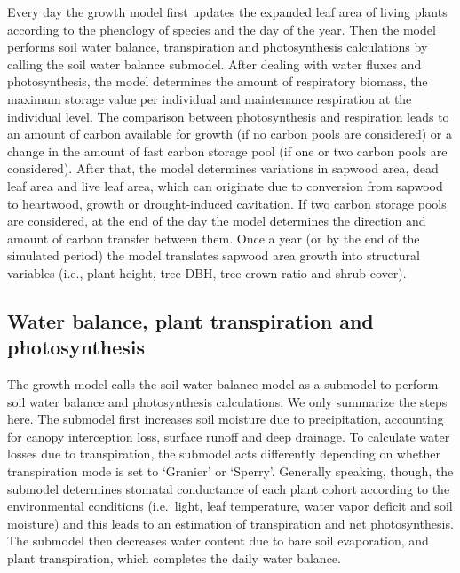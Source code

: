 \documentclass[]{book}
\begin{document}
Every day the growth model first updates the expanded leaf area of living plants according to the phenology of species and the day of the year. Then the model performs soil water balance, transpiration and photosynthesis calculations by calling the soil water balance submodel. After dealing with water fluxes and photosynthesis, the model determines the amount of respiratory biomass, the maximum storage value per individual and maintenance respiration at the individual level. The comparison between photosynthesis and respiration leads to an amount of carbon available for growth (if no carbon pools are considered) or a change in the amount of fast carbon storage pool (if one or two carbon pools are considered). After that, the model determines variations in sapwood area, dead leaf area and live leaf area, which can originate due to conversion from sapwood to heartwood, growth or drought-induced cavitation. If two carbon storage pools are considered, at the end of the day the model determines the direction and amount of carbon transfer between them. Once a year (or by the end of the simulated period) the model translates sapwood area growth into structural variables (i.e., plant height, tree DBH, tree crown ratio and shrub cover).

\hypertarget{water-balance-plant-transpiration-and-photosynthesis}{%
\subsection{Water balance, plant transpiration and photosynthesis}\label{water-balance-plant-transpiration-and-photosynthesis}}

The growth model calls the soil water balance model as a submodel to perform soil water balance and photosynthesis calculations. We only summarize the steps here. The submodel first increases soil moisture due to precipitation, accounting for canopy interception loss, surface runoff and deep drainage. To calculate water losses due to transpiration, the submodel acts differently depending on whether transpiration mode is set to `Granier' or `Sperry'. Generally speaking, though, the submodel determines stomatal conductance of each plant cohort according to the environmental conditions (i.e.~light, leaf temperature, water vapor deficit and soil moisture) and this leads to an estimation of transpiration and net photosynthesis. The submodel then decreases water content due to bare soil evaporation, and plant transpiration, which completes the daily water balance.
\end{document}
